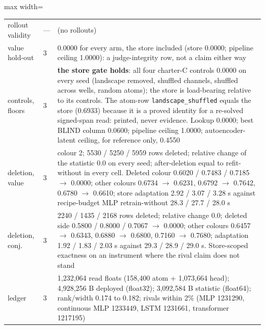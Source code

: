\documentclass{article} %
\begin{document}
\begin{table}[h]
\begin{adjustbox}{max width=\linewidth}
\begin{tabular}{p{1.9cm}p{1.2cm}p{10.0cm}}
rollout validity & --- & (no rollouts) \\
value hold-out & 3 & 0.0000 for every arm, the store included (store 0.0000; pipeline ceiling 1.0000): a judge-integrity row, not a claim either way \\
controls, floors & 3 & \textbf{the store gate holds}: all four charter-C controls 0.0000 on every seed (landscape removed, shuffled channels, shuffled across wells, random atoms); the store is load-bearing relative to its controls. The atom-row \texttt{landscape\_shuffled} equals the store (0.6933) because it is a proved identity for a re-solved signed-span read: printed, never evidence. Lookup 0.0000; best BLIND column 0.0600; pipeline ceiling 1.0000; autoencoder-latent ceiling, for reference only, 0.4550 \\
deletion, value & 3 & colour 2; 5530 / 5250 / 5959 rows deleted; relative change of the statistic 0.0 on every seed; after-deletion equal to refit-without in every cell. Deleted colour 0.6020 / 0.7483 / 0.7185 $\to$ 0.0000; other colours 0.6734 $\to$ 0.6231, 0.6792 $\to$ 0.7642, 0.6780 $\to$ 0.6610; store adaptation 2.92 / 3.07 / 3.28 s against recipe-budget MLP retrain-without 28.3 / 27.7 / 28.0 s \\
deletion, conj. & 3 & 2240 / 1435 / 2168 rows deleted; relative change 0.0; deleted side 0.5800 / 0.8000 / 0.7067 $\to$ 0.0000; other colours 0.6457 $\to$ 0.6343, 0.6880 $\to$ 0.6800, 0.7160 $\to$ 0.7680; adaptation 1.92 / 1.83 / 2.03 s against 29.3 / 28.9 / 29.0 s. Store-scoped exactness on an instrument where the rival claim does not stand \\
ledger & 3 & 1,232,064 read floats (158,400 atom + 1,073,664 head); 4,928,256 B deployed (float32); 3,092,584 B statistic (float64); rank/width 0.174 to 0.182; rivals within 2\% (MLP 1231290, continuous MLP 1233449, LSTM 1231661, transformer 1217195) \\
\bottomrule
\end{tabular}\end{adjustbox}
\end{table}

\end{document}
